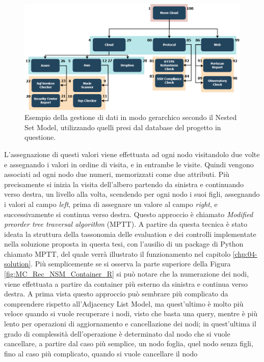 \begin{figure}[ht!]
    \includegraphics[scale=0.40]{images/MC_Rec_NSM_Tree.png}
    \caption{Esempio della gestione di dati in modo gerarchico secondo il Nested Set Model, utilizzando quelli presi dal database del 
    progetto in questione.}
    \label{fig:MC_Rec_NSM_Tree}
\end{figure}
\hfill\break
L'assegnazione di questi valori viene effettuata ad ogni nodo visitandolo due volte e assegnando i valori in ordine di visita, e in entrambe le visite. 
Quindi vengono associati ad ogni nodo due numeri, memorizzati come due attributi.
Più precisamente si inizia la visita dell'albero partendo da sinistra e continuando verso destra, un livello alla volta, scendendo per ogni
nodo i suoi figli, assegnando i valori al campo \textit{left}, prima di assegnare un valore al campo \textit{right}, e successivamente si continua verso 
destra. Questo approccio è chiamato \textit{Modified preorder tree traversal algorithm} (MPTT). A partire da questa tecnica è stato 
ideata la struttura della tassonomia delle evaluation e dei controlli implementate nella soluzione proposta in questa tesi, con 
l'ausilio di un package di Python chiamato MPTT, del quale verrà illustrato il funzionamento nel capitolo \ref{chp:04-solution}.\hfill\break
Più semplicemente se si osserva la parte superiore della Figura \ref{fig:MC_Rec_NSM_Container_R} si può notare che la numerazione dei nodi, viene
effettuata a partire da container più esterno da sinistra e continua verso destra.\hfill\break
A prima vista questo approccio può sembrare più complicato da comprendere rispetto all'Adjacency List Model, ma quest'ultimo è
molto più veloce quando si vuole recuperare i nodi, visto che basta una query, mentre è più lento per operazioni di aggiornamento e 
cancellazione dei nodi; in quest'ultima il grado di complessità dell'operazione è determinato dal nodo che si vuole cancellare, a 
partire dal caso più semplice, un nodo foglia, quel nodo senza figli, fino al caso più complicato, quando si vuole cancellare il nodo 
